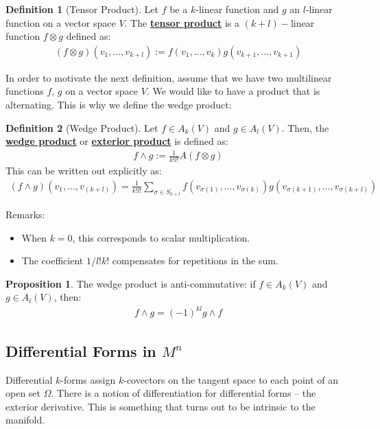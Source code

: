 \documentclass[11pt]{scrartcl}
\theoremstyle{definition}
\newtheorem{definition}{Definition}
\newtheorem{prop}{Proposition}
\theoremstyle{remark}
\newcommand{\dfn}[1]{\textbf{\underline{#1}}}
\begin{document}
{\begin{definition}[Tensor Product]
	Let $f$ be a $k$-linear function and $g$ an $l$-linear function on a vector space $V$. The \dfn{tensor product} is a $(k+l)-$linear function $f \otimes g$ defined as: 
	\begin{align}
		(f \otimes g)(v_1, ..., v_{k+l}) := f(v_1, ..., v_k) g(v_{k+1}, ..., v_{k+1}) 	
	\end{align}

\end{definition}

In order to motivate the next definition, assume that we have two multilinear functions $f$, $g$ on a vector space $V$. We would like to have a product that is alternating. This is why we define the wedge product: 

\begin{definition}[Wedge Product]
	Let $f \in A_k(V)$ and $g \in A_l(V)$. Then, the \dfn{wedge product} or \dfn{exterior product} is defined as:
	\begin{align*}
		f \wedge g := \frac{1}{k!l!} A(f \otimes g) 
	\end{align*}
	This can be written out explicitly as: 
	\begin{align*}
		(f \wedge g)(v_1, ..., v_{(k+l)}) = \frac{1}{k!l!} \sum_{ \sigma \in S_{k+l}} f(v_{\sigma(1)}, ..., v_{\sigma(k)} ) g(v_{\sigma(k+1)}, ..., v_{\sigma(k+l)}) 
	\end{align*}
\end{definition}
Remarks: 
\begin{itemize}[noitemsep]
	\item When $k=0$, this corresponds to scalar multiplication. 
	\item The coefficient $1/l!k!$ compensates for repetitions in the sum. 
\end{itemize}

\begin{prop}
	The wedge product is anti-commutative: if $f \in A_k(V)$ and $g \in A_l (V)$, then: 
	\begin{align*}
		f \wedge g = (-1)^{kl} g \wedge f
	\end{align*} 
\end{prop}

\subsection{Differential Forms in $M^n$}
Differential $k$-forms assign $k$-covectors on the tangent space to each point of an open set $\Omega$. There is a notion of differentiation for differential forms -- the exterior derivative. This is something that turns out to be intrinsic to the manifold. 

}
\end{document}
